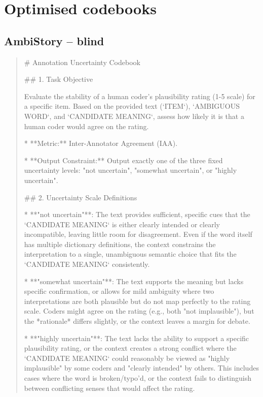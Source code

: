 \section{Optimised codebooks}
\label{app:codebooks}
\subsection*{AmbiStory -- blind}
\begin{quote}\small
# Annotation Uncertainty Codebook



## 1. Task Objective

Evaluate the stability of a human coder's plausibility rating (1-5 scale) for a specific item. Based on the provided text (`ITEM`), `AMBIGUOUS WORD`, and `CANDIDATE MEANING`, assess how likely it is that a human coder would agree on the rating.

*   **Metric:** Inter-Annotator Agreement (IAA).

*   **Output Constraint:** Output exactly one of the three fixed uncertainty levels: "not uncertain", "somewhat uncertain", or "highly uncertain".



## 2. Uncertainty Scale Definitions



*   **"not uncertain"**: The text provides sufficient, specific cues that the `CANDIDATE MEANING` is either clearly intended or clearly incompatible, leaving little room for disagreement. Even if the word itself has multiple dictionary definitions, the context constrains the interpretation to a single, unambiguous semantic choice that fits the `CANDIDATE MEANING` consistently.

*   **"somewhat uncertain"**: The text supports the meaning but lacks specific confirmation, or allows for mild ambiguity where two interpretations are both plausible but do not map perfectly to the rating scale. Coders might agree on the rating (e.g., both "not implausible"), but the *rationale* differs slightly, or the context leaves a margin for debate.

*   **"highly uncertain"**: The text lacks the ability to support a specific plausibility rating, or the context creates a strong conflict where the `CANDIDATE MEANING` could reasonably be viewed as "highly implausible" by some coders and "clearly intended" by others. This includes cases where the word is broken/typo'd, or the context fails to distinguish between conflicting senses that would affect the rating.




\end{quote}
